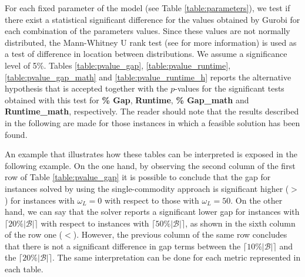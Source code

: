 \documentclass[a4paper,  review, authoryear, 1p.]{elsarticle}
\newcommand{\CV}[1]{{\color{blue}#1}}
\begin{document}
		\CV{
		For each fixed parameter of the model (see Table \ref{table:parameters}), we test if there exist a statistical significant difference for the values obtained by Gurobi for each combination of the parameters values. Since these values are not normally distributed, the Mann-Whitney U rank test (see \cite{mcknight2010} for more information) is used as a test of difference in location between distributions. We assume a significance level of 5\%. Tables \ref{table:pvalue_gap}, \ref{table:pvalue_runtime}, \ref{table:pvalue_gap_math} and \ref{table:pvalue_runtime_h} reports the alternative hypothesis that is accepted together with the $p$-values for the significant tests obtained with this test for \textbf{\% Gap}, \textbf{Runtime}, \textbf{\% Gap\_{math}} and \textbf{Runtime\_{math}}, respectively. The reader should note that the results described in the following are made for those instances in which a feasible solution has been found.

		An example that illustrates how these tables can be interpreted is exposed in the following example. On the one hand, by observing the second column of the first row of Table \ref{table:pvalue_gap} it is possible to conclude that the gap for instances solved by using the single-commodity approach is significant higher ($>$) for instances with $\omega_L=0$ with respect to those with $\omega_L=50$. On the other hand, we can say that the solver reports a significant lower gap for instances with $\lceil 20 \%|\mathcal B|\rceil$ with respect to instances with $\lceil 50 \%|\mathcal B|\rceil$, as shown in the sixth column of the row one ($<$). However, the previous column of the same row concludes that there is not a significant difference in gap terms between the $\lceil 10 \%|\mathcal B|\rceil$ and the $\lceil 20 \%|\mathcal B|\rceil$. The same interpretation can be done for each metric represented in each table.
		
}
\end{document}
